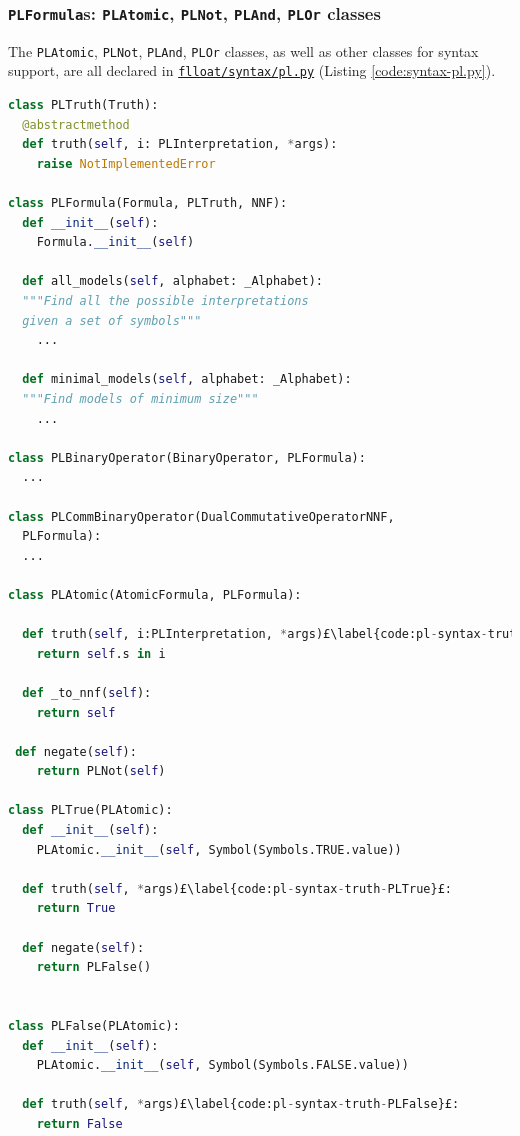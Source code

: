 \subsubsection{\texttt{PLFormula}s: \texttt{PLAtomic}, \texttt{PLNot}, \texttt{PLAnd}, \texttt{PLOr} classes}
The \texttt{PLAtomic}, \texttt{PLNot}, \texttt{PLAnd}, \texttt{PLOr} classes, as well as other \PL classes for syntax support, are all declared in \href{https://github.com/MarcoFavorito/flloat/blob/0.1.4/flloat/syntax/pl.py}{\texttt{flloat/syntax/pl.py}} (Listing \ref{code:syntax-pl.py}). 

\begin{lstlisting}[language=Python, style=Python, escapechar = £, label={code:syntax-pl.py}, caption={The \href{https://github.com/MarcoFavorito/flloat/blob/0.1.4/flloat/syntax/pl.py}{\texttt{flloat/syntax/pl.py}} module}]
class PLTruth(Truth):
  @abstractmethod
  def truth(self, i: PLInterpretation, *args):
    raise NotImplementedError

class PLFormula(Formula, PLTruth, NNF):
  def __init__(self):
    Formula.__init__(self)

  def all_models(self, alphabet: _Alphabet):
  """Find all the possible interpretations 
  given a set of symbols"""
    ...

  def minimal_models(self, alphabet: _Alphabet):
  """Find models of minimum size"""
    ...

class PLBinaryOperator(BinaryOperator, PLFormula):
  ...

class PLCommBinaryOperator(DualCommutativeOperatorNNF,
  PLFormula):
  ...

class PLAtomic(AtomicFormula, PLFormula):

  def truth(self, i:PLInterpretation, *args)£\label{code:pl-syntax-truth-PLAtomic}£:
    return self.s in i

  def _to_nnf(self):
    return self

 def negate(self):
    return PLNot(self)

class PLTrue(PLAtomic):
  def __init__(self):
    PLAtomic.__init__(self, Symbol(Symbols.TRUE.value))

  def truth(self, *args)£\label{code:pl-syntax-truth-PLTrue}£:
    return True

  def negate(self):
    return PLFalse()


class PLFalse(PLAtomic):
  def __init__(self):
    PLAtomic.__init__(self, Symbol(Symbols.FALSE.value))

  def truth(self, *args)£\label{code:pl-syntax-truth-PLFalse}£:
    return False


\end{lstlisting}
